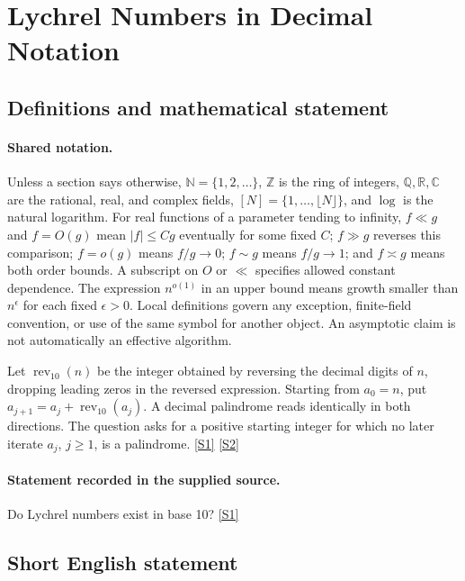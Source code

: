 \documentclass[11pt,a4paper]{article}
\newcommand{\N}{\mathbb{N}}
\newcommand{\Z}{\mathbb{Z}}
\newcommand{\Q}{\mathbb{Q}}
\newcommand{\R}{\mathbb{R}}
\newcommand{\C}{\mathbb{C}}
\newcommand{\sref}[2]{\hyperlink{source:#1:#2}{[S#2]}}
\begin{document}
\section{Lychrel Numbers in Decimal Notation}\label{statement}


\subsection{Definitions and mathematical statement}

\paragraph{Shared notation.}Unless a section says otherwise, $\N=\{1,2,\ldots\}$,
$\Z$ is the ring of integers, $\Q,\R,\C$ are the rational, real, and complex
fields, $[N]=\{1,\ldots,\lfloor N\rfloor\}$, and $\log$ is the natural
logarithm. For real functions of a parameter tending to infinity,
$f\ll g$ and $f=O(g)$ mean $|f|\leq Cg$ eventually for some fixed $C$;
$f\gg g$ reverses this comparison; $f=o(g)$ means $f/g\to0$;
$f\sim g$ means $f/g\to1$; and $f\asymp g$ means both order bounds.
A subscript on $O$ or $\ll$ specifies allowed constant dependence.
The expression $n^{o(1)}$ in an upper bound means growth smaller than
$n^\epsilon$ for each fixed $\epsilon>0$. Local definitions govern any
exception, finite-field convention, or use of the same symbol for another
object. An asymptotic claim is not automatically an effective algorithm.



Let $\operatorname{rev}_{10}(n)$ be the integer obtained by reversing the decimal digits of $n$, dropping leading zeros in the reversed expression. Starting from $a_0=n$, put $a_{j+1}=a_j+\operatorname{rev}_{10}(a_j)$. A decimal palindrome reads identically in both directions. The question asks for a positive starting integer for which no later iterate $a_j$, $j\geq1$, is a palindrome. \sref{statement}{1} \sref{statement}{2}

\paragraph{Statement recorded in the supplied source.}
Do Lychrel numbers exist in base 10? \sref{statement}{1}

\subsection{Short English statement}
\end{document}

